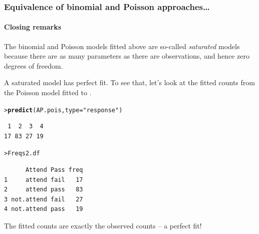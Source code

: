 \documentclass{beamer}\usepackage[]{graphicx}\usepackage[]{xcolor}
\makeatletter
\newcommand{\hlstr}[1]{\textcolor[rgb]{0.192,0.494,0.8}{#1}}%
\newcommand{\hlstd}[1]{\textcolor[rgb]{0.345,0.345,0.345}{#1}}%
\newcommand{\hlkwc}[1]{\textcolor[rgb]{0.333,0.667,0.333}{#1}}%
\newcommand{\hlkwd}[1]{\textcolor[rgb]{0.737,0.353,0.396}{\textbf{#1}}}%
\newenvironment{kframe}{%
 \def\at@end@of@kframe{}%
 \ifinner\ifhmode%
  \def\at@end@of@kframe{\end{minipage}}%
  \begin{minipage}{\columnwidth}%
 \fi\fi%
 \def\FrameCommand##1{\hskip\@totalleftmargin \hskip-\fboxsep
 \colorbox{shadecolor}{##1}\hskip-\fboxsep
     \hskip-\linewidth \hskip-\@totalleftmargin \hskip\columnwidth}%
 \MakeFramed {\advance\hsize-\width
   \@totalleftmargin\z@ \linewidth\hsize
   \@setminipage}}%
 {\par\unskip\endMakeFramed%
 \at@end@of@kframe}
\newenvironment{knitrout}{}{} %
\makeatother
\begin{document}


\begin{frame}[fragile]
\frametitle{Equivalence of binomial and Poisson approaches\ldots}
\framesubtitle{Closing remarks}
The binomial and Poisson models fitted above are so-called {\em saturated} models because there are as many parameters as there are observations, and hence zero degrees of freedom.
\bigskip

A saturated model has perfect fit. To see that, let's look at the fitted counts from the Poisson model fitted to .
\medskip

\begin{knitrout}\scriptsize
{}\color{fgcolor}\begin{kframe}
\begin{alltt}
\hlstd{> }\hlkwd{predict}\hlstd{(AP.pois,}\hlkwc{type}\hlstd{=}\hlstr{"response"}\hlstd{)}
\end{alltt}
\begin{verbatim}
 1  2  3  4 
17 83 27 19 
\end{verbatim}
\begin{alltt}
\hlstd{> }\hlstd{Freqs2.df}
\end{alltt}
\begin{verbatim}
      Attend Pass freq
1     attend fail   17
2     attend pass   83
3 not.attend fail   27
4 not.attend pass   19
\end{verbatim}
\end{kframe}
\end{knitrout}

The fitted counts are exactly the observed counts -- a perfect fit!

\end{frame}
\end{document}
